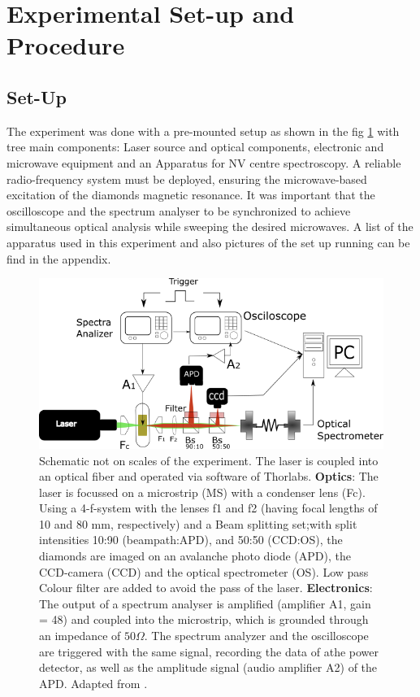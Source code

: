 \section{Experimental Set-up and Procedure}
\subsection{Set-Up}

The experiment was done with a pre-mounted setup as shown in the fig \ref{fig:setup1} with tree main components: Laser source and optical components, electronic and microwave equipment and an Apparatus for NV centre spectroscopy. A reliable radio-frequency system must be deployed, ensuring the microwave-based excitation of the diamonds magnetic resonance. It was important that the oscilloscope and the spectrum analyser to be synchronized to achieve simultaneous optical analysis while sweeping the desired microwaves. A list of the apparatus used in this experiment and also pictures of the set up running can be find in the appendix.

\begin{figure}
	\centering
	\includegraphics[width=0.7\linewidth]{../figures/setup1}
	\caption[setup]{Schematic not on scales of the experiment. The laser is coupled into an optical ﬁber and operated via software of Thorlabs. \textbf{Optics}: The laser is focussed on a microstrip (MS) with a condenser lens (Fc). Using a 4-f-system with the lenses f1 and f2 (having focal lengths of 10 and 80 mm, respectively) and a Beam splitting set;with split intensities 10:90 (beampath:APD), and 50:50 (CCD:OS), the diamonds are imaged on an avalanche photo diode (APD), the CCD-camera (CCD) and the optical spectrometer (OS). Low pass Colour ﬁlter are added to avoid the pass of the laser.
	\textbf{Electronics}: The output of a spectrum analyser is ampliﬁed (ampliﬁer A1, gain = 48) and coupled into the microstrip, which is grounded through an impedance of $50\Omega$.
	The spectrum analyzer and the oscilloscope are triggered with the same signal, recording the data of athe power detector, as well as the amplitude signal (audio ampliﬁer A2) of the APD.  Adapted from \cite{anleitung}.}
	\label{fig:setup1}
\end{figure}

